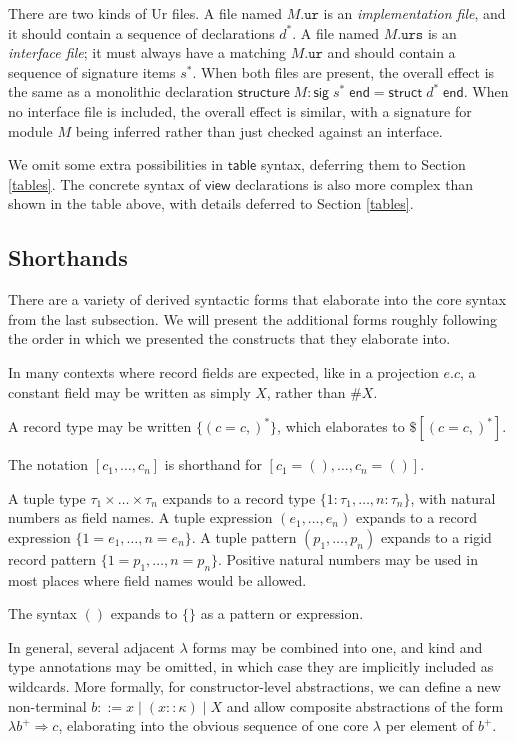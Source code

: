 \documentclass{article}
\newcommand{\mt}[1]{\mathsf{#1}}
\begin{document}
There are two kinds of Ur files.  A file named $M\texttt{.ur}$ is an \emph{implementation file}, and it should contain a sequence of declarations $d^*$.  A file named $M\texttt{.urs}$ is an \emph{interface file}; it must always have a matching $M\texttt{.ur}$ and should contain a sequence of signature items $s^*$.  When both files are present, the overall effect is the same as a monolithic declaration $\mt{structure} \; M : \mt{sig} \; s^* \; \mt{end} = \mt{struct} \; d^* \; \mt{end}$.  When no interface file is included, the overall effect is similar, with a signature for module $M$ being inferred rather than just checked against an interface.

We omit some extra possibilities in $\mt{table}$ syntax, deferring them to Section \ref{tables}.  The concrete syntax of $\mt{view}$ declarations is also more complex than shown in the table above, with details deferred to Section \ref{tables}.

\subsection{Shorthands}

There are a variety of derived syntactic forms that elaborate into the core syntax from the last subsection.  We will present the additional forms roughly following the order in which we presented the constructs that they elaborate into.

In many contexts where record fields are expected, like in a projection $e.c$, a constant field may be written as simply $X$, rather than $\#X$.

A record type may be written $\{(c = c,)^*\}$, which elaborates to $\$[(c = c,)^*]$.

The notation $[c_1, \ldots, c_n]$ is shorthand for $[c_1 = (), \ldots, c_n = ()]$.

A tuple type $\tau_1 \times \ldots \times \tau_n$ expands to a record type $\{1 : \tau_1, \ldots, n : \tau_n\}$, with natural numbers as field names.  A tuple expression $(e_1, \ldots, e_n)$ expands to a record expression $\{1 = e_1, \ldots, n = e_n\}$.  A tuple pattern $(p_1, \ldots, p_n)$ expands to a rigid record pattern $\{1 = p_1, \ldots, n = p_n\}$.  Positive natural numbers may be used in most places where field names would be allowed.

The syntax $()$ expands to $\{\}$ as a pattern or expression.

In general, several adjacent $\lambda$ forms may be combined into one, and kind and type annotations may be omitted, in which case they are implicitly included as wildcards.  More formally, for constructor-level abstractions, we can define a new non-terminal $b ::= x \mid (x :: \kappa) \mid X$ and allow composite abstractions of the form $\lambda b^+ \Rightarrow c$, elaborating into the obvious sequence of one core $\lambda$ per element of $b^+$.
\end{document}
